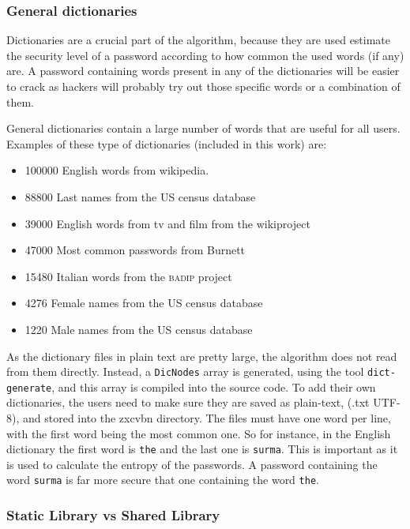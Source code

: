 \subsubsection*{General dictionaries}

Dictionaries are a crucial part of the algorithm, because they are used estimate the security level of a password according to how common the used words (if any) are. A password containing words present in any of the dictionaries will be easier to crack as hackers will probably try out those specific words or a combination of them.

General dictionaries contain a large number of words that are useful for all users. Examples of these type of dictionaries (included in this work) are:
\begin{itemize}
\setlength\itemsep{0pt}
\item 100000 English words from wikipedia.
\item 88800 Last names from the US census database
\item 39000 English words from tv and film from the wikiproject \cite{wiktionary}
\item 47000 Most common passwords from Burnett \cite{burnett}
\item 15480 Italian words from the \textsc{badip} project \cite{badip} 
\item 4276 Female names from the US census database 
\item 1220 Male names from the US census database
\end{itemize} 

As the dictionary files in plain text are pretty large, the algorithm does not read from them directly. Instead, a \texttt{DicNodes} array is generated, using the tool \texttt{dict-generate}, and this array is compiled into the source code.
To add their own dictionaries, the users need to make sure they are saved as plain-text, (.txt UTF-8), and stored into the zxcvbn directory. The files must have one word per line, with the first word being the most common one. So for instance, in the English dictionary the first word is \texttt{the} and the last one is \texttt{surma}. This is important as it is used to calculate the entropy of the passwords. A password containing the word \texttt{surma} is far more secure that one containing the word \texttt{the}.

\subsubsection*{Static Library vs Shared Library}


